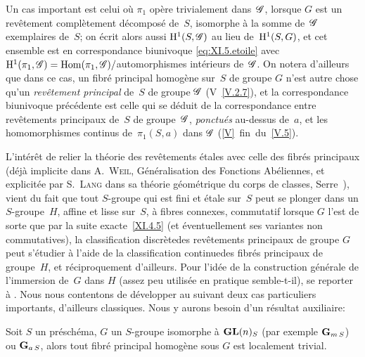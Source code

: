 \label{page-300}
Un cas important est celui o\`u $\pi_1$ op\`ere trivialement dans~$\cal{G}$, \ie lorsque $G$ est un rev\^etement compl\`etement
d\'ecompos\'e de~$S$, isomorphe \`a la somme de~$\cal{G}$
exemplaires de~$S$; on \'ecrit alors aussi $\H^1(S,\cal{G})$ au lieu
de~$\mathrm{H}^1(S,G)$, et cet ensemble est en correspondance biunivoque
\eqref{eq:XI.5.etoile} avec $\H^1(\pi_1,\cal G)= \Hom(\pi_1,\cal{G})/$automorphismes int\'erieurs de~$\cal{G}$. On notera d'ailleurs que dans ce cas, un fibr\'e
principal homog\`ene sur~$S$ de groupe $G$ n'est autre chose qu'un
\emph{revêtement principal} de~$S$ de groupe $\cal{G}$
(V~\ref{V.2.7}), et la correspondance biunivoque pr\'ec\'edente
est celle qui se d\'eduit de la correspondance entre rev\^etements
principaux de~$S$ de groupe~$\cal{G}$, \emph{ponctués} au-dessus
de~$a$, et les homomorphismes continus de~$\pi_1(S,a)$ dans $\cal{G}$
(\ref{V}~fin~du~\No \ref{V.5}).

L'int\'er\^et de relier la th\'eorie des rev\^etements
\'etales avec celle des fibr\'es principaux (d\'ej\`a
implicite dans \textsc{A.\, Weil}, G\'en\'eralisation des Fonctions
Ab\'eliennes, et explicit\'ee par \textsc{S.\, Lang} dans sa th\'eorie
g\'eom\'etrique du corps de classes, \cf Serre~\cite{XI.5}), vient du fait
que tout $S$-groupe qui est fini et \'etale sur~$S$ peut se plonger
dans un $S$-groupe~$H$, affine et lisse sur~$S$, \`a fibres
connexes, commutatif lorsque $G$ l'est de sorte que par la suite
exacte~\ref{XI.4.5} (et \'eventuellement ses variantes non
commutatives), la classification \og discr\`ete\fg des rev\^etements
principaux de groupe $G$ peut s'\'etudier \`a l'aide de la
classification \og continue\fg des fibr\'es principaux de groupe~$H$,
et r\'eciproquement d'ailleurs. Pour l'id\'ee de la construction
g\'en\'erale de l'immersion de~$G$ dans $H$ (assez peu
utilis\'ee en pratique semble-t-il), se reporter \`a
\cite[VI~2.8]{XI.5}. Nous nous contentons de d\'evelopper au \No suivant
deux cas particuliers importants, d'ailleurs classiques. Nous y aurons
besoin d'un r\'esultat auxiliaire:

\begin{proposition}
\label{XI.5.1}
Soit
$S$ un pr\'esch\'ema, $G$ un $S$-groupe isomorphe \`a
$\operatorname{\mathbf{GL}}(n)_S$ (par exemple $\mathbf{G}_{m\,S}$) ou $\mathbf{G}_{a\,S}$, alors tout
fibr\'e principal homog\`ene sous $G$ est localement trivial.
\end{proposition}

